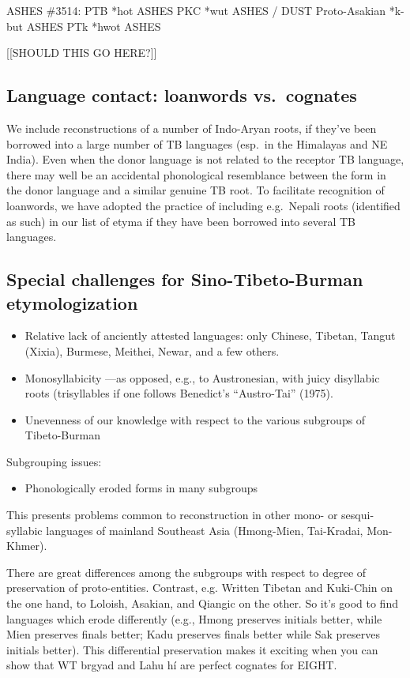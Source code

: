 ASHES
\#3514: PTB *hot ASHES
PKC *wut ASHES / DUST
Proto-Asakian *k-but ASHES	
PTk *hwot ASHES

[[SHOULD THIS GO HERE?]]

\subsection{Language contact: loanwords vs.\ cognates}

We include reconstructions of a number of Indo-Aryan roots, if they've been borrowed into a large number of TB languages (esp.\ in the Himalayas and NE India).
Even when the donor language is not related to the receptor TB language, there may well be an accidental phonological resemblance between the form in the donor language and a similar genuine TB root. To facilitate recognition of loanwords, we have adopted the practice of including e.g.\ Nepali roots (identified as such) in our list of etyma if they have been borrowed into several TB languages.

\subsection{Special challenges for Sino-Tibeto-Burman etymologization}

\begin{itemize}
\item Relative lack of anciently attested languages: only Chinese, Tibetan, Tangut (Xixia), Burmese, Meithei, Newar, and a few others.
\item Monosyllabicity	—as opposed, e.g., to Austronesian, with juicy disyllabic roots (trisyllables if one follows Benedict’s “Austro-Tai” (1975).
\item Unevenness of our knowledge with respect to the various subgroups of Tibeto-Burman
\end{itemize}

Subgrouping issues: 

\begin{itemize}
\item Phonologically eroded forms in many subgroups 
\end{itemize}

This presents problems common to reconstruction in other mono- or sesqui-syllabic languages of mainland Southeast Asia (Hmong-Mien, Tai-Kradai, Mon-Khmer).
	
There are great differences among the subgroups with respect to degree of preservation of proto-entities. Contrast, e.g. Written Tibetan and Kuki-Chin on the one hand, to Loloish, Asakian, and Qiangic on the other. So it’s good to find languages which erode differently (e.g., Hmong preserves initials better, while Mien preserves finals better; Kadu preserves finals better while Sak preserves initials better). This differential preservation makes it exciting when you can show that WT brgyad and Lahu hí are perfect cognates for EIGHT.

